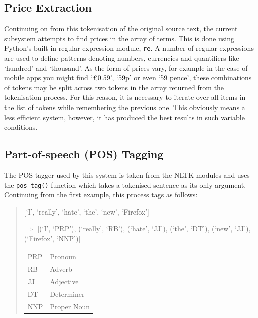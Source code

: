 \subsection{Price Extraction}
\label{sec:price}
Continuing on from this tokenisation of the original source text, the current subsystem attempts to find prices in the array of terms. This is done using Python's built-in regular expression module, \texttt{re}. A number of regular expressions are used to define patterns denoting numbers, currencies and quantifiers like `hundred' and `thousand'. As the form of prices vary, for example in the case of mobile apps you might find `£0.59', `59p' or even `59 pence', these combinations of tokens may be split across two tokens in the array returned from the tokenisation process. For this reason, it is necessary to iterate over all items in the list of tokens while remembering the previous one. This obviously means a less efficient system, however, it has produced the best results in such variable conditions.

\subsection{Part-of-speech (POS) Tagging}
The POS tagger used by this system is taken from the NLTK modules and uses the \texttt{pos\_tag()} function which takes a tokenised sentence as its only argument. Continuing from the first example, this process tags as follows: 
\begin{quote}
[`I', `really', `hate', `the', `new', `Firefox']

\begin{math}\Rightarrow\end{math}
[(`I', `PRP'), (`really', `RB'), (`hate', `JJ'), (`the', `DT'), (`new', `JJ'), (`Firefox', `NNP')]

\begin{center}
\begin{tabular}{ l | l }
  \hline                        
  PRP & Pronoun \\
  RB & Adverb \\
  JJ & Adjective \\
  DT & Determiner \\
  NNP & Proper Noun \\
  \hline  
\end{tabular}
\end{center}
\end{quote}

